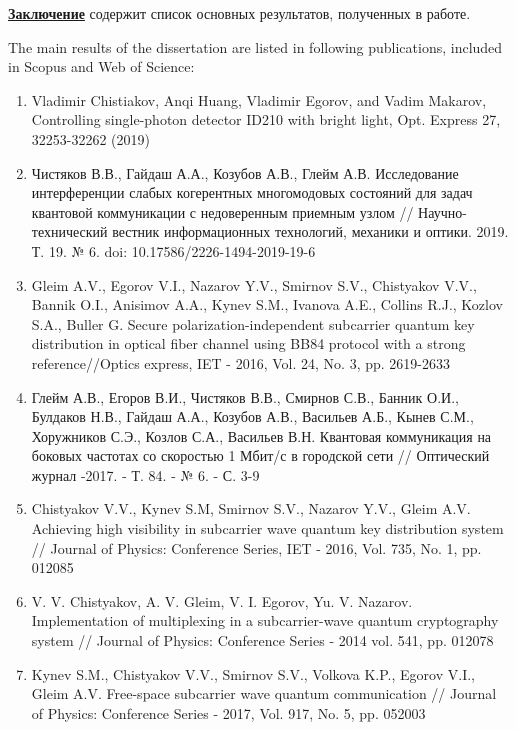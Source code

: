  \underline{\textbf{Заключение}} содержит список основных результатов, полученных в работе. 

  


{The main results of the dissertation are listed in following publications, included in Scopus and Web of Science:}
\begin{enumerate}\addtolength{\itemsep}{-0.5\baselineskip}
\renewcommand{\labelenumi}{[\theenumi]}
\item Vladimir Chistiakov, Anqi Huang, Vladimir Egorov, and Vadim Makarov, Controlling single-photon detector ID210 with bright light, Opt. Express 27, 32253-32262 (2019)
\\
\item Чистяков В.В., Гайдаш А.А., Козубов А.В., Глейм А.В. Исследование интерференции слабых когерентных многомодовых состояний для задач квантовой коммуникации с недоверенным приемным узлом // Научно-технический вестник информационных технологий, механики и оптики. 2019. Т. 19. № 6. doi: 10.17586/2226-1494-2019-19-6
\\
\item    Gleim A.V., Egorov V.I., Nazarov Y.V., Smirnov S.V., Chistyakov V.V., Bannik O.I., Anisimov A.A., Kynev S.M., Ivanova A.E., Collins R.J., Kozlov S.A., Buller G. Secure polarization-independent subcarrier quantum key distribution in optical fiber channel using BB84 protocol with a strong reference//Optics express, IET - 2016, Vol. 24, No. 3, pp. 2619-2633
\\
\item  Глейм А.В., Егоров В.И., Чистяков В.В., Смирнов С.В., Банник О.И., Булдаков Н.В., Гайдаш А.А., Козубов А.В., Васильев А.Б., Кынев С.М., Хоружников С.Э., Козлов С.А., Васильев В.Н. Квантовая коммуникация на боковых частотах со скоростью 1 Мбит/с в городской сети // Оптический журнал -2017. - Т. 84. - № 6. - С. 3-9
\\
\item  Chistyakov V.V., Kynev S.M, Smirnov S.V., Nazarov Y.V., Gleim A.V. Achieving high visibility in subcarrier wave quantum key distribution system // Journal of Physics: Conference Series, IET - 2016, Vol. 735, No. 1, pp. 012085
\\
\item V. V. Chistyakov, A. V. Gleim, V. I. Egorov, Yu. V. Nazarov. Implementation of multiplexing in a subcarrier-wave quantum cryptography system // Journal of Physics: Conference Series - 2014  vol. 541,  pp. 012078
\\
\item   Kynev S.M., Chistyakov V.V., Smirnov S.V., Volkova K.P., Egorov V.I., Gleim A.V. Free-space subcarrier wave quantum communication // Journal of Physics: Conference Series - 2017, Vol. 917, No. 5, pp. 052003
\\


\end{enumerate}
